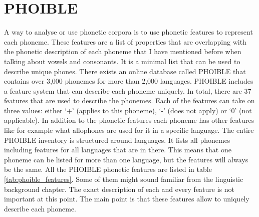 \section{PHOIBLE}
A way to analyse or use phonetic corpora is to use phonetic features to represent each phoneme. These features are a list of properties that are overlapping with the phonetic description of each phoneme that I have mentioned before when talking about vowels and consonants. It is a minimal list that can be used to describe unique phones. There exists an online database called PHOIBLE \citep{phoible} that contains over 3,000 phonemes for more than 2,000 languages. PHOIBLE includes a feature system that can describe each phoneme uniquely. In total, there are 37 features that are used to describe the phonemes. Each of the features can take on three values: either `+' (applies to this phoneme), `-' (does not apply) or `0' (not applicable). In addition to the phonetic features each phoneme has other features like for example what allophones are used for it in a specific language. The entire PHOIBLE inventory is structured around languages. It lists all phonemes including features for all languages that are in there. This means that one phoneme can be listed for more than one language, but the features will always be the same. All the PHOIBLE phonetic features are listed in table \ref{tab:phoible_features}. Some of them might sound familiar from the linguistic background chapter. The exact description of each and every feature is not important at this point. The main point is that these features allow to uniquely describe each phoneme.




